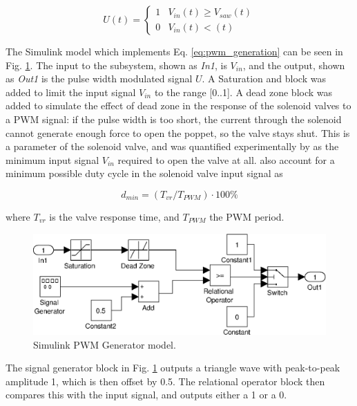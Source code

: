 \begin{equation}
\label{eq:pwm_generation}
U\left(t\right) = 
\begin{cases}
1 & V_{in}\left(t\right) \geq V_{saw}\left(t\right) \\
0 & V_{in}\left(t\right) < \left(t\right)
\end{cases}
\end{equation}

The Simulink model which implements Eq. \ref{eq:pwm_generation} can be seen in Fig. \ref{fig:pneumatics_pwm}. The input to the subsystem, shown as \emph{In1}, is $V_{in}$, and the output, shown as \emph{Out1} is the pulse width modulated signal $U$. A Saturation and block was added to limit the input signal $V_{in}$ to the range [0..1]. A dead zone block was added to simulate the effect of dead zone in the response of the solenoid valves to a PWM signal: if the pulse width is too short, the current through the solenoid cannot generate enough force to open the poppet, so the valve stays shut. This is a parameter of the solenoid valve, and was quantified experimentally by \cite{valve_models} as the minimum input signal $V_{in}$ required to open the valve at all.  also account for a minimum possible duty cycle in the solenoid valve input signal as

\begin{equation}
  \label{eq:pwm_duty_min}
  d_{min}=\left(T_{vr}/T_{PWM}\right)\cdot100\%
\end{equation}

where $T_{vr}$ is the valve response time, and $T_{PWM}$ the PWM period.


\begin{figure}[h]
\centering
\includegraphics[scale=0.65]{implementation/figures/pneumatic_modelling2.eps}
\caption{Simulink PWM Generator model.}
\label{fig:pneumatics_pwm}
\end{figure}

The signal generator block in Fig. \ref{fig:pneumatics_pwm} outputs a triangle wave with peak-to-peak amplitude 1, which is then offset by 0.5. The relational operator block then compares this with the input signal, and outputs either a 1 or a 0.

